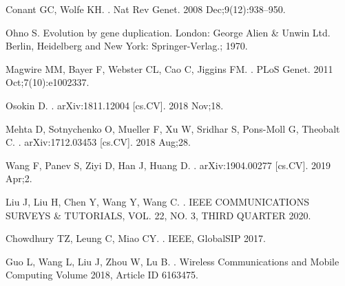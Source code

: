 \documentclass[10pt,letterpaper]{article}
\begin{document}
	\begin{thebibliography}{10}
		
		Conant GC, Wolfe KH.
		.
		\newblock Nat Rev Genet. 2008 Dec;9(12):938--950.
		
		Ohno S.
		\newblock Evolution by gene duplication.
		\newblock London: George Alien \& Unwin Ltd. Berlin, Heidelberg and New York:
		Springer-Verlag.; 1970.
		
		Magwire MM, Bayer F, Webster CL, Cao C, Jiggins FM.
		.
		\newblock PLoS Genet. 2011 Oct;7(10):e1002337.
		
		
		
		
		Osokin D.
		.
		\newblock arXiv:1811.12004 [cs.CV]. 2018 Nov;18.
		
		Mehta D, Sotnychenko O, Mueller F, Xu W, Sridhar S, Pons-Moll G, Theobalt C.
		.
		\newblock arXiv:1712.03453 [cs.CV]. 2018 Aug;28.
		
		
		Wang F, Panev S, Ziyi D, Han J, Huang D.
		.
		\newblock arXiv:1904.00277 [cs.CV]. 2019 Apr;2.
		
		
		
		Liu J, Liu H, Chen Y, Wang Y, Wang C.
		.
		\newblock IEEE COMMUNICATIONS SURVEYS \& TUTORIALS, VOL. 22, NO. 3, THIRD QUARTER 2020.
		
		Chowdhury TZ, Leung C, Miao CY.
		.
		\newblock IEEE, GlobalSIP 2017.
		
		
		Guo L, Wang L, Liu J, Zhou W, Lu B.
		.
		\newblock Wireless Communications and Mobile Computing
		Volume 2018, Article ID 6163475.
		

\end{thebibliography}
\end{document}
